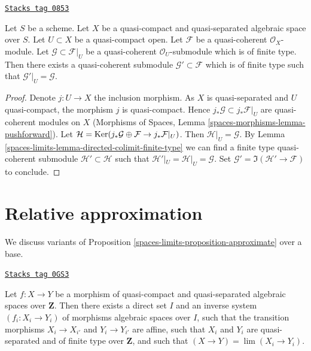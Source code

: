 \begin{lemma}[Extend]
\label{spaces-limits-lemma-extend}
\href{https://stacks.math.columbia.edu/tag/0853}{\texttt{Stacks tag 0853}}

Let $S$ be a scheme.
Let $X$ be a quasi-compact and quasi-separated algebraic space over $S$.
Let $U \subset X$ be a quasi-compact open.
Let $\mathcal{F}$ be a quasi-coherent $\mathcal{O}_X$-module.
Let $\mathcal{G} \subset \mathcal{F}|_U$ be a quasi-coherent
$\mathcal{O}_U$-submodule which is of finite type. Then
there exists a quasi-coherent submodule $\mathcal{G}' \subset \mathcal{F}$
which is of finite type such that $\mathcal{G}'|_U = \mathcal{G}$.
\end{lemma}

\begin{proof}
Denote $j : U \to X$ the inclusion morphism. As $X$ is quasi-separated
and $U$ quasi-compact, the morphism $j$ is quasi-compact. Hence
$j_*\mathcal{G} \subset j_*\mathcal{F}|_U$ are quasi-coherent modules
on $X$ (Morphisms of Spaces, Lemma
\ref{spaces-morphisms-lemma-pushforward}).
Let $\mathcal{H} =
\operatorname{Ker}(j_*\mathcal{G} \oplus \mathcal{F} \to j_*\mathcal{F}|_U)$.
Then $\mathcal{H}|_U = \mathcal{G}$. By
Lemma \ref{spaces-limits-lemma-directed-colimit-finite-type}
we can find a finite type quasi-coherent submodule
$\mathcal{H}' \subset \mathcal{H}$ such that
$\mathcal{H}'|_U = \mathcal{H}|_U = \mathcal{G}$.
Set $\mathcal{G}' = \Im(\mathcal{H}' \to \mathcal{F})$
to conclude.
\end{proof}

\section{Relative approximation}
\label{spaces-limits-section-relative-approximation}
We discuss variants of Proposition \ref{spaces-limits-proposition-approximate}
over a base.

\begin{lemma}
\label{spaces-limits-lemma-approximate-morphism}
\href{https://stacks.math.columbia.edu/tag/0GS3}{\texttt{Stacks tag 0GS3}}

Let $f : X \to Y$ be a morphism of quasi-compact and quasi-separated
algebraic spaces over $\mathbf{Z}$.
Then there exists a direct set $I$ and an inverse system $(f_i : X_i \to Y_i)$
of morphisms algebraic spaces over $I$, such that the transition morphisms
$X_i \to X_{i'}$ and $Y_i \to Y_{i'}$ are affine, such that $X_i$
and $Y_i$ are quasi-separated and of finite type over $\mathbf{Z}$, and
such that $(X \to Y) = \lim (X_i \to Y_i)$.
\end{lemma}

